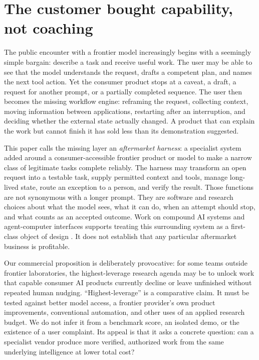 \section{The customer bought capability, not coaching}

The public encounter with a frontier model increasingly begins with a seemingly simple bargain: describe a task and receive useful work. The user may be able to see that the model understands the request, drafts a competent plan, and names the next tool action. Yet the consumer product stops at a caveat, a draft, a request for another prompt, or a partially completed sequence. The user then becomes the missing workflow engine: reframing the request, collecting context, moving information between applications, restarting after an interruption, and deciding whether the external state actually changed. A product that can explain the work but cannot finish it has sold less than its demonstration suggested.

This paper calls the missing layer an \emph{aftermarket harness}: a specialist system added around a consumer-accessible frontier product or model to make a narrow class of legitimate tasks complete reliably. The harness may transform an open request into a testable task, supply permitted context and tools, manage long-lived state, route an exception to a person, and verify the result. Those functions are not synonymous with a longer prompt. They are software and research choices about what the model sees, what it can do, when an attempt should stop, and what counts as an accepted outcome. Work on compound AI systems and agent-computer interfaces supports treating this surrounding system as a first-class object of design \citep{compound,sweagent}. It does not establish that any particular aftermarket business is profitable.

Our commercial proposition is deliberately provocative: for some teams outside frontier laboratories, the highest-leverage research agenda may be to unlock work that capable consumer AI products currently decline or leave unfinished without repeated human nudging. ``Highest-leverage'' is a comparative claim. It must be tested against better model access, a frontier provider's own product improvements, conventional automation, and other uses of an applied research budget. We do not infer it from a benchmark score, an isolated demo, or the existence of a user complaint. Its appeal is that it asks a concrete question: can a specialist vendor produce more verified, authorized work from the same underlying intelligence at lower total cost?

